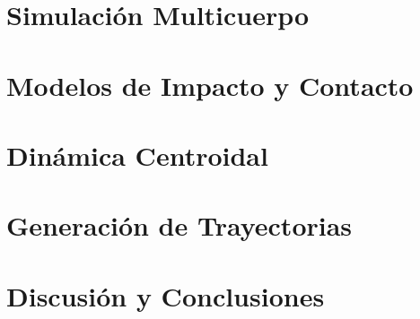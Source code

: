 \documentclass[journal,letterpaper,twoside,twocolumn]{IEEEtran}
\begin{document}
\section{Simulación Multicuerpo}
\label{sec:simula}

\section{Modelos de Impacto y Contacto}
\label{sec:impYcon}

\section{Dinámica Centroidal}
\label{sec:dinCentr}

\section{Generación de Trayectorias}
\label{sec:genTray}

\section{Discusión y Conclusiones}
\label{sec:conclu}
\end{document}

